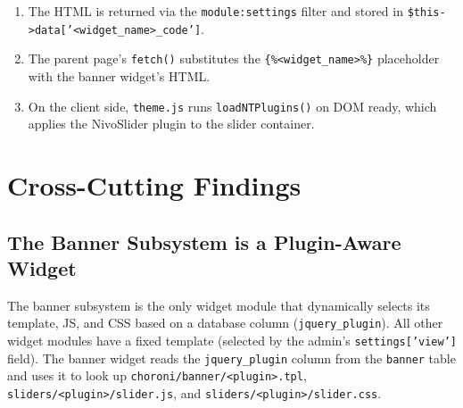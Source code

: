 \documentclass[11pt,a4paper]{article}
\begin{document}
\begin{enumerate}[leftmargin=1.6em,itemsep=2pt]
\begin{enumerate}[itemsep=2pt]
          \item Requires the template. The template:
                \begin{itemize}[itemsep=2pt]
                  \item Iterates \texttt{\$banner['items']}, emits
                        \texttt{<img>} tags with localised titles.
                  \item Pushes a config object into
                        \texttt{window.ntPlugins}.
                  \item Calls \texttt{loadNTPlugins()}.
                \end{itemize}
          \item Substitutes \texttt{\{\%<per-item-widget-name>\%\}}
                placeholders with the per-item widget HTML.
          \item Returns the HTML.
        \end{enumerate}
  \item The HTML is returned via the \texttt{module:settings} filter
        and stored in \texttt{\$this->data['<widget\_name>\_code']}.
  \item The parent page's \texttt{fetch()} substitutes the
        \texttt{\{\%<widget\_name>\%\}} placeholder with the banner
        widget's HTML.
  \item On the client side, \texttt{theme.js} runs
        \texttt{loadNTPlugins()} on DOM ready, which applies the
        NivoSlider plugin to the slider container.
\end{enumerate}

\section{Cross-Cutting Findings}\label{sec:findings}

\subsection{The Banner Subsystem is a Plugin-Aware Widget}

The banner subsystem is the only widget module that dynamically
selects its template, JS, and CSS based on a database column
(\texttt{jquery\_plugin}). All other widget modules have a fixed
template (selected by the admin's \texttt{settings['view']} field).
The banner widget reads the \texttt{jquery\_plugin} column from the
\texttt{banner} table and uses it to look up
\texttt{choroni/banner/<plugin>.tpl},
\texttt{sliders/<plugin>/slider.js}, and
\texttt{sliders/<plugin>/slider.css}.
\end{document}
